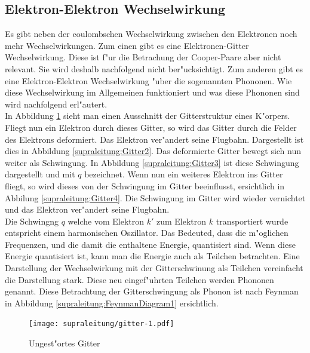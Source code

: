 \begin{refsection}
\section{Elektron-Elektron Wechselwirkung}
Es gibt neben der coulombschen Wechselwirkung zwischen den Elektronen noch mehr Wechselwirkungen. Zum einen gibt es eine Elektronen-Gitter Wechselwirkung. Diese ist f"ur die Betrachung der Cooper-Paare aber nicht relevant. Sie wird deshalb nachfolgend nicht ber"ucksichtigt. Zum anderen gibt es eine Elektron-Elektron Wechselwirkung "uber die sogenannten Phononen. Wie diese Wechselwirkung im Allgemeinen funktioniert und was diese Phononen sind wird nachfolgend erl"autert.
\\
In Abbildung \ref{supraleitung:Gitter1} sieht man einen Ausschnitt der Gitterstruktur eines K"orpers. Fliegt nun ein Elektron durch dieses Gitter, so wird das Gitter durch die Felder des Elektrons deformiert. Das Elektron ver"andert seine Flugbahn. Dargestellt ist dies in Abbildung \ref{supraleitung:Gitter2}. Das deformierte Gitter bewegt sich nun weiter als Schwingung. In Abbildung \ref{supraleitung:Gitter3} ist diese Schwingung dargestellt und mit $q$ bezeichnet. Wenn nun ein weiteres Elektron ins Gitter fliegt, so wird dieses von der Schwingung im Gitter beeinflusst, ersichtlich in Abbilung \ref{supraleitung:Gitter4}. Die Schwingung im Gitter wird wieder vernichtet und das Elektron ver"andert seine Flugbahn.
\\
Die Schwingng $q$ welche vom Elektron $k'$ zum Elektron $k$ transportiert wurde entspricht einem harmonischen Oszillator. Das Bedeuted, dass die m"oglichen Frequenzen, und die damit die enthaltene Energie, quantisiert sind. Wenn diese Energie quantisiert ist, kann man die Energie auch als Teilchen betrachten. Eine Darstellung der Wechselwirkung mit der Gitterschwinung als Teilchen vereinfacht die Darstellung stark. Diese neu eingef"uhrten Teilchen werden Phononen genannt.
Diese Betrachtung der Gitterschwingung als Phonon ist nach Feynman in Abbildung \ref{supraleitung:FeynmanDiagram1} ersichtlich.%
\begin{figure}[h]	
\centering
\texttt{[image: supraleitung/gitter-1.pdf]} %
\caption{Ungest"ortes Gitter
\label{supraleitung:Gitter1}}
\end{figure}

\end{refsection}
